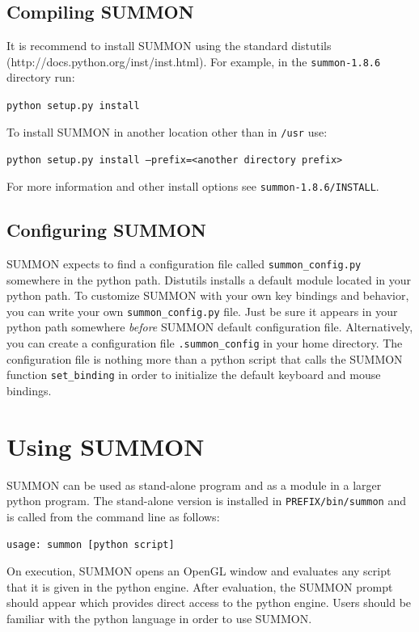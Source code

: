 \documentclass[12pt]{article}
\newcommand{\code}[1]{{\tt #1}}
\newcommand{\codeblock}[1]{\vspace{.1in} {\tt #1} \vspace{.1in}}
\newcommand{\version}{1.8.6}
\begin{document}
\subsection{Compiling SUMMON}

It is recommend to install SUMMON using the standard distutils 
(http://docs.python.org/inst/inst.html).  For example, in the
\code{summon-\version} directory run:

\codeblock{python setup.py install}

To install SUMMON in another location other than in \code{/usr} use:

\codeblock{python setup.py install --prefix=<another directory prefix>}

For more information and other install options see 
\code{summon-\version/INSTALL}.


\subsection{Configuring SUMMON}

SUMMON expects to find a configuration file called  \code{summon\_config.py}
somewhere in the python path.  Distutils installs a default module located in
your python path.  To customize SUMMON with your own key bindings and behavior,
you can write your own \code{summon\_config.py} file.  Just be sure it appears
in your python path somewhere {\em before} SUMMON default configuration file. 
Alternatively, you can create a configuration file \code{.summon\_config} in
your home directory.  The configuration file is nothing more than a python
script that calls the SUMMON function  \code{set\_binding} in order to
initialize the default keyboard and mouse  bindings.



\section{Using SUMMON}
\label{sec:using}

SUMMON can be used as stand-alone program and as a module in a larger python
program.  The stand-alone version is installed in \code{PREFIX/bin/summon} and
is called from the command line as follows:

\codeblock{usage: summon [python script]}

On execution, SUMMON opens an OpenGL window and evaluates any script that it is
given in the python engine. After evaluation, the SUMMON prompt should appear
which provides direct access to the python engine.  Users should be familiar
with the python language in order to use SUMMON.
\end{document}
